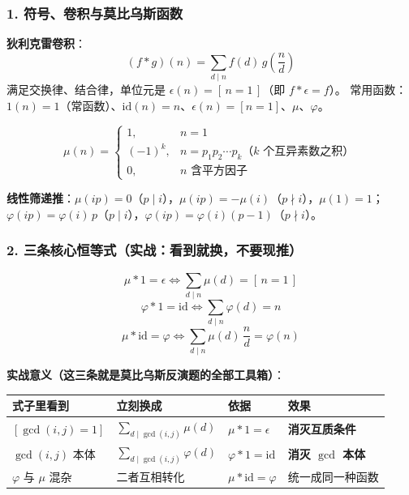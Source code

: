 \subsubsection*{1. 符号、卷积与莫比乌斯函数}

\textbf{狄利克雷卷积}：
$$(f * g)(n) = \sum_{d \mid n} f(d)\,g\!\left(\frac nd\right)$$
满足交换律、结合律，单位元是 $\epsilon(n) = [\,n=1\,]$（即 $f * \epsilon = f$）。
常用函数：$1(n) = 1$（常函数）、$\mathrm{id}(n) = n$、$\epsilon(n) = [n=1]$、$\mu$、$\varphi$。

$$\mu(n) = \begin{cases}
1, & n = 1\\
(-1)^k, & n = p_1p_2\cdots p_k \text{（} k \text{ 个互异素数之积）}\\
0, & n \text{ 含平方因子}
\end{cases}$$

\textbf{线性筛递推}：$\mu(ip) = 0$（$p \mid i$），$\mu(ip) = -\mu(i)$（$p \nmid i$），$\mu(1)=1$；
$\varphi(ip) = \varphi(i)\,p$（$p \mid i$），$\varphi(ip) = \varphi(i)(p-1)$（$p \nmid i$）。

\hrulefill

\subsubsection*{2. 三条核心恒等式（实战：看到就换，不要现推）}

$$\boxed{\;\mu * 1 = \epsilon \iff \sum_{d \mid n}\mu(d) = [\,n=1\,]\;}$$
$$\boxed{\;\varphi * 1 = \mathrm{id} \iff \sum_{d \mid n}\varphi(d) = n\;}$$
$$\boxed{\;\mu * \mathrm{id} = \varphi \iff \sum_{d \mid n}\mu(d)\,\frac nd = \varphi(n)\;}$$

\textbf{实战意义（这三条就是莫比乌斯反演题的全部工具箱）}：

\begin{center}
\begin{tabular}{|p{3.2cm}|p{4.9cm}|p{2.3cm}|p{3.0cm}|}
\hline
\textbf{式子里看到} & \textbf{立刻换成} & \textbf{依据} & \textbf{效果} \\
\hline
$[\gcd(i,j)=1]$ & $\displaystyle\sum_{d \mid \gcd(i,j)}\mu(d)$ & $\mu * 1 = \epsilon$ & \textbf{消灭互质条件} \\
\hline
$\gcd(i,j)$ 本体 & $\displaystyle\sum_{d \mid \gcd(i,j)}\varphi(d)$ & $\varphi * 1 = \mathrm{id}$ & \textbf{消灭 $\gcd$ 本体} \\
\hline
$\varphi$ 与 $\mu$ 混杂 & 二者互相转化 & $\mu * \mathrm{id} = \varphi$ & 统一成同一种函数 \\
\hline
\end{tabular}
\end{center}

